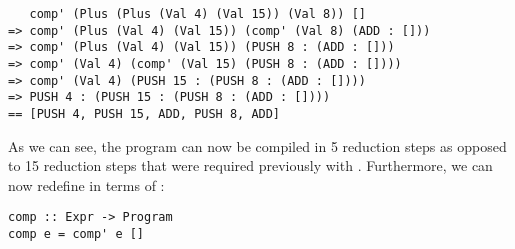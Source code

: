 \begin{verbatim}
   comp' (Plus (Plus (Val 4) (Val 15)) (Val 8)) []
=> comp' (Plus (Val 4) (Val 15)) (comp' (Val 8) (ADD : []))
=> comp' (Plus (Val 4) (Val 15)) (PUSH 8 : (ADD : []))
=> comp' (Val 4) (comp' (Val 15) (PUSH 8 : (ADD : []))) 
=> comp' (Val 4) (PUSH 15 : (PUSH 8 : (ADD : []))) 
=> PUSH 4 : (PUSH 15 : (PUSH 8 : (ADD : []))) 
== [PUSH 4, PUSH 15, ADD, PUSH 8, ADD] 
\end{verbatim}
As we can see, the program can now be compiled in 5 reduction steps as opposed to 15 reduction steps that were required previously with . Furthermore, we can now redefine  in terms of :
\begin{verbatim}
comp :: Expr -> Program 
comp e = comp' e []
\end{verbatim}